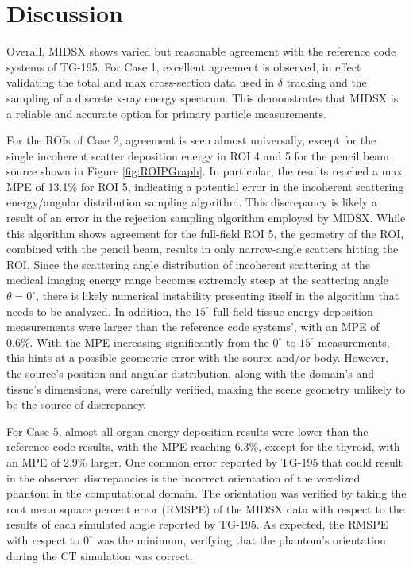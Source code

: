 \newpage
\section{Discussion}
\par Overall, MIDSX shows varied but reasonable agreement with the reference code systems of TG-195. For Case 1, excellent agreement is observed, in effect validating the total and max cross-section data used in $\delta$ tracking and the sampling of a discrete x-ray energy spectrum. This demonstrates that MIDSX is a reliable and accurate option for primary particle measurements.

\par For the ROIs of Case 2, agreement is seen almost universally, except for the single incoherent scatter deposition energy in ROI 4 and 5 for the pencil beam source shown in Figure \ref{fig:ROIPGraph}. In particular, the results reached a max MPE of 13.1\% for ROI 5, indicating a potential error in the incoherent scattering energy/angular distribution sampling algorithm. This discrepancy is likely a result of an error in the rejection sampling algorithm employed by MIDSX. While this algorithm shows agreement for the full-field ROI 5, the geometry of the ROI, combined with the pencil beam, results in only narrow-angle scatters hitting the ROI. Since the scattering angle distribution of incoherent scattering at the medical imaging energy range becomes extremely steep at the scattering angle $\theta = 0^\circ$, there is likely numerical instability presenting itself in the algorithm that needs to be analyzed. In addition, the $15^\circ$ full-field tissue energy deposition measurements were larger than the reference code systems', with an MPE of 0.6\%. With the MPE increasing significantly from the $0^\circ$ to $15^\circ$ measurements, this hints at a possible geometric error with the source and/or body. However, the source's position and angular distribution, along with the domain's and tissue's dimensions, were carefully verified, making the scene geometry unlikely to be the source of discrepancy.

\par For Case 5, almost all organ energy deposition results were lower than the reference code results, with the MPE reaching 6.3\%, except for the thyroid, with an MPE of 2.9\% larger. One common error reported by TG-195 that could result in the observed discrepancies is the incorrect orientation of the voxelized phantom in the computational domain. The orientation was verified by taking the root mean square percent error (RMSPE) of the MIDSX data with respect to the results of each simulated angle reported by TG-195. As expected, the RMSPE with respect to $0^\circ$ was the minimum, verifying that the phantom's orientation during the CT simulation was correct.

